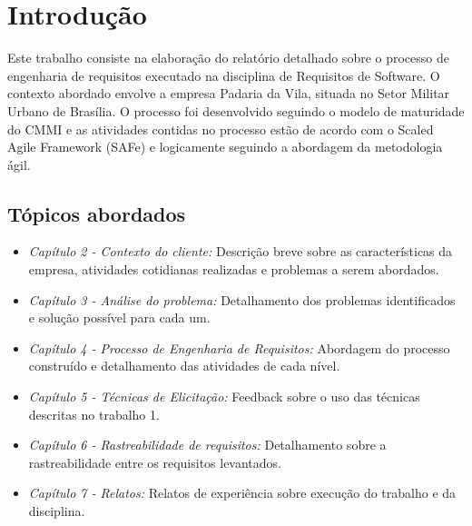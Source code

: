\chapter{Introdução}

Este trabalho consiste na elaboração do relatório detalhado sobre o processo de engenharia de requisitos executado na disciplina de Requisitos de Software. O contexto abordado envolve a empresa Padaria da Vila, situada no Setor Militar Urbano de Brasília. O processo foi desenvolvido seguindo o modelo de maturidade do CMMI e as atividades contidas no processo estão de acordo com o Scaled Agile Framework (SAFe) e logicamente seguindo a abordagem da metodologia ágil.

\section{Tópicos abordados}

\begin{itemize}
	\item \textit{Capítulo 2 - Contexto do cliente:} Descrição breve sobre as características da empresa, atividades cotidianas realizadas e problemas a serem abordados. 
	\item \textit{Capítulo 3 - Análise do problema:} Detalhamento dos problemas identificados e solução possível para cada um.

	\item \textit{Capítulo 4 - Processo de Engenharia de Requisitos:} Abordagem do processo construído e detalhamento das atividades de cada nível.

	\item \textit{Capítulo 5 - Técnicas de Elicitação:} Feedback sobre o uso das técnicas descritas no trabalho 1.


	\item \textit{Capítulo 6 - Rastreabilidade de requisitos:} Detalhamento sobre a rastreabilidade entre os requisitos levantados.


	\item \textit{Capítulo 7 - Relatos:} Relatos de experiência sobre execução do trabalho e da disciplina.
\end{itemize}
